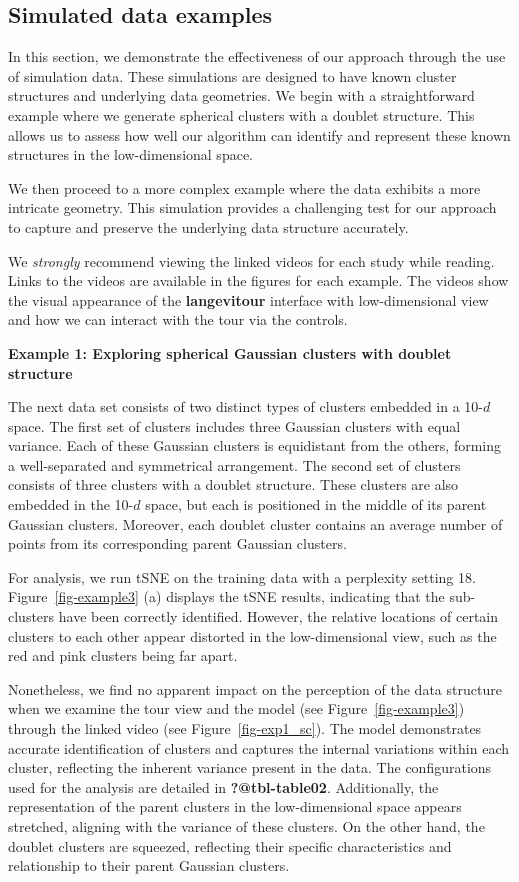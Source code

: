 \documentclass[
  12pt]{article}
\begin{document}
\hypertarget{sec-simpleex}{%
\subsection{Simulated data examples}\label{sec-simpleex}}

In this section, we demonstrate the effectiveness of our approach
through the use of simulation data. These simulations are designed to
have known cluster structures and underlying data geometries. We begin
with a straightforward example where we generate spherical clusters with
a doublet structure. This allows us to assess how well our algorithm can
identify and represent these known structures in the low-dimensional
space.

We then proceed to a more complex example where the data exhibits a more
intricate geometry. This simulation provides a challenging test for our
approach to capture and preserve the underlying data structure
accurately.

We \emph{strongly} recommend viewing the linked videos for each study
while reading. Links to the videos are available in the figures for each
example. The videos show the visual appearance of the
\textbf{langevitour} interface with low-dimensional view and how we can
interact with the tour via the controls.

\textbf{Example 1: Exploring spherical Gaussian clusters with doublet
structure}

The next data set consists of two distinct types of clusters embedded in
a 10-\(d\) space. The first set of clusters includes three Gaussian
clusters with equal variance. Each of these Gaussian clusters is
equidistant from the others, forming a well-separated and symmetrical
arrangement. The second set of clusters consists of three clusters with
a doublet structure. These clusters are also embedded in the 10-\(d\)
space, but each is positioned in the middle of its parent Gaussian
clusters. Moreover, each doublet cluster contains an average number of
points from its corresponding parent Gaussian clusters.

For analysis, we run tSNE on the training data with a perplexity setting
18. Figure~\ref{fig-example3} (a) displays the tSNE results, indicating
that the sub-clusters have been correctly identified. However, the
relative locations of certain clusters to each other appear distorted in
the low-dimensional view, such as the red and pink clusters being far
apart.

Nonetheless, we find no apparent impact on the perception of the data
structure when we examine the tour view and the model (see
Figure~\ref{fig-example3}) through the linked video (see
Figure~\ref{fig-exp1_sc}). The model demonstrates accurate
identification of clusters and captures the internal variations within
each cluster, reflecting the inherent variance present in the data. The
configurations used for the analysis are detailed in
\textbf{?@tbl-table02}. Additionally, the representation of the parent
clusters in the low-dimensional space appears stretched, aligning with
the variance of these clusters. On the other hand, the doublet clusters
are squeezed, reflecting their specific characteristics and relationship
to their parent Gaussian clusters.
\end{document}
